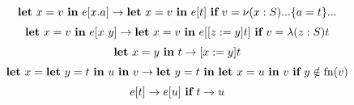 \[\begin{array}{c}
    \textbf{let}\ x = v\ \textbf{in}\ e[x.a] \rightarrow \textbf{let}\ x = v\ \textbf{in}\ e[t]
        \ \textbf{if}\  v = \nu(x:S)...\{a = t\}... \\[2mm]
    \textbf{let}\ x = v\ \textbf{in}\ e[x\ y] \rightarrow \textbf{let}\ x = v\ \textbf{in}\ e[[z := y]t]
        \ \textbf{if}\  v = \lambda(z:S)t \\[2mm]
    \textbf{let}\ x = y\ \textbf{in}\ t \rightarrow [x := y]{t} \\[2mm]
    \textbf{let}\ x = \textbf{let}\ y = t\ \textbf{in}\ u\ \textbf{in}\ v \rightarrow \textbf{let}\ y = t\ \textbf{in}\ \textbf{let}\ x = u\ \textbf{in}\ v
        \ \textbf{if}\  y \notin \text{fn}(v) \\[2mm]
    e[t] \rightarrow e[u] \ \textbf{if}\  t \rightarrow u
\end{array}\]
